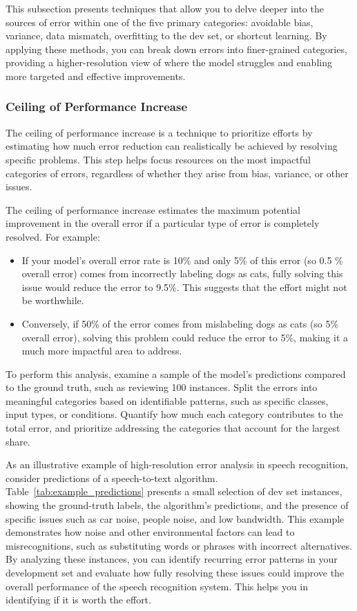 \documentclass[12pt,openany]{book}
\begin{document}
This subsection presents techniques that allow you to delve deeper into the sources of error within one of the five primary categories: avoidable bias, variance, data mismatch, overfitting to the dev set, or shortcut learning. By applying these methods, you can break down errors into finer-grained categories, providing a higher-resolution view of where the model struggles and enabling more targeted and effective improvements.

\subsubsection{Ceiling of Performance Increase}

The ceiling of performance increase is a technique to prioritize efforts by estimating how much error reduction can realistically be achieved by resolving specific problems. This step helps focus resources on the most impactful categories of errors, regardless of whether they arise from bias, variance, or other issues. \newline

The ceiling of performance increase estimates the maximum potential improvement in the overall error if a particular type of error is completely resolved. For example:
\begin{itemize}
    \item If your model's overall error rate is 10\% and only 5\% of this error (so 0.5 \% overall error) comes from incorrectly labeling dogs as cats, fully solving this issue would reduce the error to 9.5\%. This suggests that the effort might not be worthwhile.
    \item Conversely, if 50\% of the error comes from mislabeling dogs as cats (so 5\% overall error), solving this problem could reduce the error to 5\%, making it a much more impactful area to address.
\end{itemize}

To perform this analysis, examine a sample of the model's predictions compared to the ground truth, such as reviewing 100 instances. Split the errors into meaningful categories based on identifiable patterns, such as specific classes, input types, or conditions. Quantify how much each category contributes to the total error, and prioritize addressing the categories that account for the largest share. \newline

As an illustrative example of high-resolution error analysis in speech recognition, consider  predictions of a speech-to-text algorithm. Table~\ref{tab:example_predictions} presents a small selection of dev set instances, showing the ground-truth labels, the algorithm’s predictions, and the presence of specific issues such as car noise, people noise, and low bandwidth. This example demonstrates how noise and other environmental factors can lead to misrecognitions, such as substituting words or phrases with incorrect alternatives. By analyzing these instances, you can identify recurring error patterns in your development set and evaluate how fully resolving these issues could improve the overall performance of the speech recognition system. This helps you in identifying if it is worth the effort.
\end{document}
